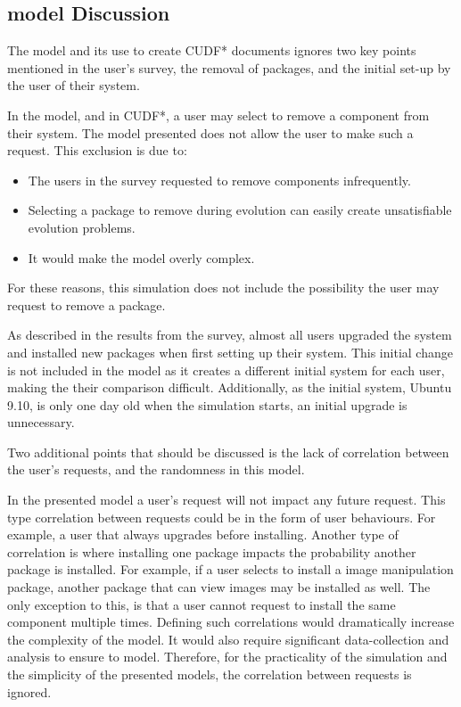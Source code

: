 \subsection{\usermodel model Discussion}
The \usermodel model and its use to create CUDF* documents ignores two key points mentioned in the user's survey,
the removal of packages, and the initial set-up by the user of their system.

In the \modelname model, and in CUDF*, a user may select to remove a component from their system.
The \usermodel model presented does not allow the user to make such a request.
This exclusion is due to:
\begin{itemize}
  \item The users in the survey requested to remove components infrequently.
  \item Selecting a package to remove during evolution can easily create unsatisfiable evolution problems.
  \item It would make the \usermodel model overly complex. 
\end{itemize}
For these reasons, this simulation does not include the possibility the user may request to remove a package.

As described in the results from the survey, almost all users upgraded the system and installed new packages when first setting up their system.
This initial change is not included in the \usermodel model as it creates a different initial system for each user,
making the their comparison difficult.
Additionally, as the initial system, Ubuntu 9.10, is only one day old when the simulation starts, an initial upgrade is unnecessary.

Two additional points that should be discussed is the lack of correlation between the user's requests,
and the randomness in this model.

In the presented \usermodel model a user's request will not impact any future request.
This type correlation between requests could be in the form of user behaviours.
For example, a user that always upgrades before installing. 
Another type of correlation is where installing one package impacts the probability another package is installed.
For example, if a user selects to install a image manipulation package, another package that can view images may be installed as well.
The only exception to this, is that a user cannot request to install the same component multiple times.
Defining such correlations would dramatically increase the complexity of the \usermodel model.
It would also require significant data-collection and analysis to ensure to model.
Therefore, for the practicality of the simulation and the simplicity of the presented models, the correlation between requests is ignored.

